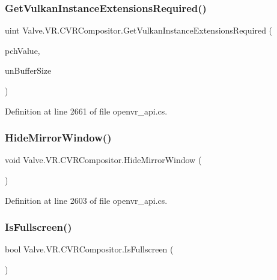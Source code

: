 \subsubsection{\texorpdfstring{GetVulkanInstanceExtensionsRequired()}{GetVulkanInstanceExtensionsRequired()}}
{\footnotesize\ttfamily uint Valve.\+V\+R.\+C\+V\+R\+Compositor.\+Get\+Vulkan\+Instance\+Extensions\+Required (\begin{DoxyParamCaption}\item[{System.\+Text.\+String\+Builder}]{pch\+Value,  }\item[{uint}]{un\+Buffer\+Size }\end{DoxyParamCaption})}



Definition at line 2661 of file openvr\+\_\+api.\+cs.

\mbox{\label{class_valve_1_1_v_r_1_1_c_v_r_compositor_a083c0219863318019461d31b512de406}} 
\subsubsection{\texorpdfstring{HideMirrorWindow()}{HideMirrorWindow()}}
{\footnotesize\ttfamily void Valve.\+V\+R.\+C\+V\+R\+Compositor.\+Hide\+Mirror\+Window (\begin{DoxyParamCaption}{ }\end{DoxyParamCaption})}



Definition at line 2603 of file openvr\+\_\+api.\+cs.

\mbox{\label{class_valve_1_1_v_r_1_1_c_v_r_compositor_a8d9c2a37367803beea6f015e65d37cf8}} 
\subsubsection{\texorpdfstring{IsFullscreen()}{IsFullscreen()}}
{\footnotesize\ttfamily bool Valve.\+V\+R.\+C\+V\+R\+Compositor.\+Is\+Fullscreen (\begin{DoxyParamCaption}{ }\end{DoxyParamCaption})}




